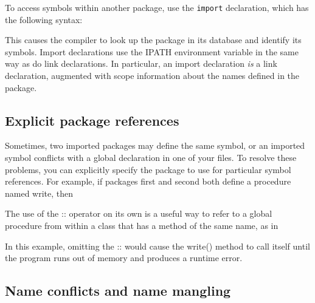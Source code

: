 To access symbols within another package, use the \texttt{import} declaration,
which has the following syntax:


This causes the compiler to look up the package in its database and
identify its symbols.  Import declarations use the IPATH
environment variable in the same
way as do link declarations. In particular, an import declaration
\textit{is} a link declaration, augmented with scope
information about the names defined in the package.

\subsection*{Explicit package references}

Sometimes, two imported packages may define the same symbol, or an imported
symbol conflicts with a global declaration in one of your files. To resolve
these problems, you can explicitly specify the package to use for particular
symbol references. For example, if packages first and second both define a
procedure named write, then


The use of the \textsf{::} operator on its own is a useful way to refer
to a global procedure from within a class that has a method of the same
name, as in


In this example, omitting the \textsf{::} would cause the
\textsf{write()} method to call itself until the program runs out of
memory and produces a runtime error.

\subsection*{Name conflicts and name mangling}

